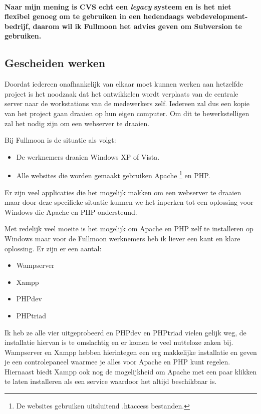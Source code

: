 \documentclass[12pt,a4paper]{article}
\begin{document}
    \paragraph{Naar mijn mening is CVS echt een \emph{legacy} systeem en is het niet flexibel genoeg om te gebruiken in een hedendaags webdevelopment-bedrijf, daarom wil ik Fullmoon het advies geven om Subversion te gebruiken.}
    
    \subsection{Gescheiden werken}
    
    Doordat iedereen onafhankelijk van elkaar moet kunnen werken aan hetzelfde project is het noodzaak dat het ontwikkelen wordt verplaats van de centrale server naar de workstations van de medewerkers zelf. Iedereen zal dus een kopie van het project gaan draaien op hun eigen computer. Om dit te bewerkstelligen zal het nodig zijn om een webserver te draaien.
    
    Bij Fullmoon is de situatie als volgt:
    
    \begin{itemize}
      \item De werknemers draaien Windows XP of Vista.
      \item Alle websites die worden gemaakt gebruiken Apache \footnote{De websites gebruiken uitsluitend .htaccess bestanden.} en PHP.
    \end{itemize}
    
    Er zijn veel applicaties die het mogelijk makken om een webserver te draaien maar door deze specifieke situatie kunnen we het inperken tot een oplossing voor Windows die Apache en PHP ondersteund.
    
    Met redelijk veel moeite is het mogelijk om Apache en PHP zelf te installeren op Windows maar voor de Fullmoon werknemers heb ik liever een kant en klare oplossing. Er zijn er een aantal:
    
    \begin{itemize}
      \item Wampserver
      \item Xampp
      \item PHPdev
      \item PHPtriad
    \end{itemize}
    
    Ik heb ze alle vier uitgeprobeerd en PHPdev en PHPtriad vielen gelijk weg, de installatie hiervan is te omslachtig en er komen te veel nutteloze zaken bij. Wampserver en Xampp hebben hierintegen een erg makkelijke installatie en geven je een controlepaneel waarmee je alles voor Apache en PHP kunt regelen. Hiernaast biedt Xampp ook nog de mogelijkheid om Apache met een paar klikken te laten installeren als een service waardoor het altijd beschikbaar is.
    
\end{document}
